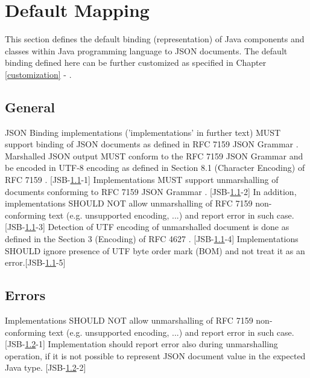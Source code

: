 \chapter{Default Mapping}
\label{defaultmapping}

This section defines the default binding (representation) of Java components and classes within Java programming language to JSON documents. The default binding defined here can be further customized as specified in Chapter \ref{customization} - .

\section{General}
\label{sec:general}
JSON Binding implementations ('implementations' in further text) MUST support binding of JSON documents as defined in RFC 7159 JSON Grammar \cite{rfc7159}. Marshalled JSON output MUST conform to the RFC 7159 JSON Grammar \cite{rfc7159} and be encoded in UTF-8 encoding as defined in Section 8.1 (Character Encoding) of RFC 7159 \cite{rfc7159}. [JSB-\ref{sec:general}-1] 
Implementations MUST support unmarshalling of documents conforming to RFC 7159 JSON Grammar \cite{rfc7159}. [JSB-\ref{sec:general}-2] In addition, implementations SHOULD NOT allow unmarshalling of RFC 7159 \cite{rfc7159} non-conforming text (e.g. unsupported encoding, ...) and report error in such case. [JSB-\ref{sec:general}-3] Detection of UTF encoding of unmarshalled document is done as defined in the Section 3 (Encoding) of RFC 4627 \cite{rfc4627}. [JSB-\ref{sec:general}-4] Implementations SHOULD ignore presence of UTF byte order mark (BOM) and not treat it as an error.[JSB-\ref{sec:general}-5]

\section{Errors}
\label{sec:errors}
Implementations SHOULD NOT allow unmarshalling of RFC 7159 \cite{rfc7159} non-conforming text (e.g. unsupported encoding, ...) and report error in such case. [JSB-\ref{sec:errors}-1] Implementation should report error also during unmarshalling operation, if it is not possible to represent JSON document value in the expected Java type. [JSB-\ref{sec:errors}-2]

